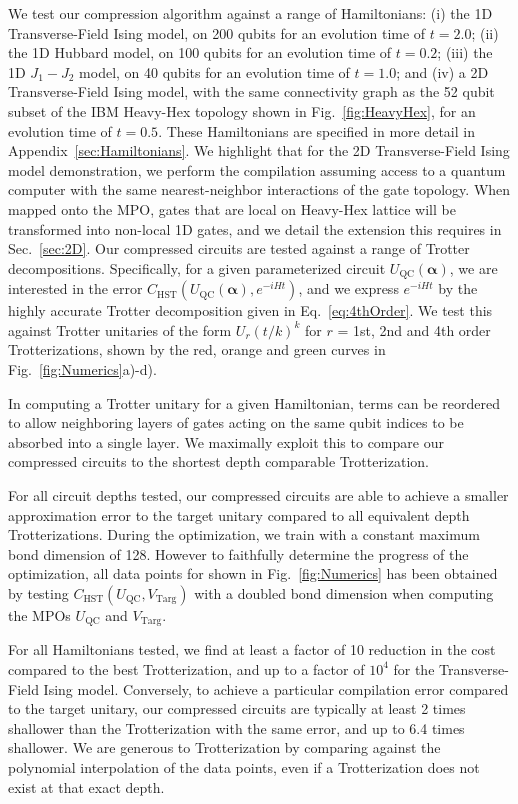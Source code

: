 \documentclass[a4paper,twocolumn,11pt,accepted=2025-06-10]{quantumarticle}
\renewcommand{\vec}[1]{\boldsymbol{#1}}
\begin{document}
We test our compression algorithm against a range of Hamiltonians: (i) the 1D Transverse-Field Ising model, on 200 qubits for an evolution time of $t=2.0$; (ii) the 1D Hubbard model, on 100 qubits for an evolution time of $t=0.2$; (iii) the 1D $J_1-J_2$ model, on 40 qubits for an evolution time of $t=1.0$; and (iv) a 2D Transverse-Field Ising model, with the same connectivity graph as the 52 qubit subset of the IBM Heavy-Hex topology shown in Fig.~\ref{fig:HeavyHex}, for an evolution time of $t=0.5$. These Hamiltonians are specified in more detail in Appendix~\ref{sec:Hamiltonians}. We highlight that for the 2D Transverse-Field Ising model demonstration, we perform the compilation assuming access to a quantum computer with the same nearest-neighbor interactions of the gate topology. When mapped onto the MPO, gates that are local on Heavy-Hex lattice will be transformed into non-local 1D gates, and we detail the extension this requires in Sec.~\ref{sec:2D}.
Our compressed circuits are tested against a range of Trotter decompositions. Specifically, for a given parameterized circuit $U_{\text{QC}}(\vec{\alpha})$, we are interested in the error $C_{\text{HST}}(U_{\text{QC}}(\vec{\alpha}), e^{-iHt})$, and we express $e^{-iHt}$ by the highly accurate Trotter decomposition given in Eq.~\eqref{eq:4thOrder}. We test this against Trotter unitaries of the form $U_r(t/k)^k$ for $r$ = 1st, 2nd and 4th order Trotterizations, shown by the red, orange and green curves in Fig.~\ref{fig:Numerics}a)-d).

In computing a Trotter unitary for a given Hamiltonian, terms can be reordered to allow neighboring layers of gates acting on the same qubit indices to be absorbed into a single layer. We maximally exploit this to compare our compressed circuits to the shortest depth comparable Trotterization.

For all circuit depths tested, our compressed circuits are able to achieve a smaller approximation error to the target unitary compared to all equivalent depth Trotterizations. During the optimization, we train with a constant maximum bond dimension of 128. However to faithfully determine the progress of the optimization, all data points for  shown in Fig.~\ref{fig:Numerics} has been obtained by testing $C_{\text{HST}}(U_{\text{QC}}, V_{\text{Targ}})$ with a doubled bond dimension when computing the MPOs $U_{\text{QC}}$ and $V_{\text{Targ}}$. 

For all Hamiltonians tested, we find at least a factor of 10 reduction in the cost compared to the best Trotterization, and up to a factor of $10^4$ for the Transverse-Field Ising model. Conversely, to achieve a particular compilation error compared to the target unitary, our compressed circuits are typically at least 2 times shallower than the Trotterization with the same error, and up to 6.4 times shallower. We are generous to Trotterization by comparing against the polynomial interpolation of the data points, even if a Trotterization does not exist at that exact depth. 
\end{document}
